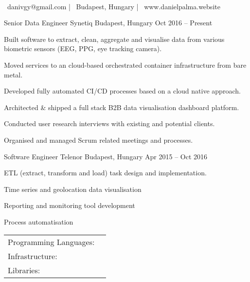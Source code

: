 \documentclass[]{awesome-cv}
\begin{document}
    
\begin{center}
	  \\
	\vspace{2mm}
	{\faEnvelope\ danivgy@gmail.com} | {\faMapMarker\ Budapest, Hungary} | {\faLink\ www.danielpalma.website}
\end{center}
\begin{cventries}
	\cventry
	{Senior Data Engineer}
	{Synetiq}
	{Budapest, Hungary}
	{Oct 2016 – Present}
	{\begin{cvitems}
		\item {Built software to extract, clean, aggregate and visualise data from various biometric sensors (EEG, PPG, eye tracking camera).}
		\item {Moved services to an cloud-based orchestrated container infrastructure from bare metal.}
		\item {Developed fully automated CI/CD processes based on a cloud native approach.}
		\item {Architected \& shipped a full stack B2B data visualisation dashboard platform.}
		\item {Conducted user research interviews with existing and potential clients.}
		\item {Organised and managed Scrum related meetings and processes.}
		\end{cvitems}}
	\cventry
	{Software Engineer}
	{Telenor}
	{Budapest, Hungary}
	{Apr 2015 – Oct 2016}
	{\begin{cvitems}
		\item {ETL (extract, transform and load) task design and implementation.}
		\item {Time series and geolocation data visualisation}
		\item {Reporting and monitoring tool development}
		\item {Process automatisation}
		\end{cvitems}}
\end{cventries}
\begin{cventries}
	\cventry
	{}
	{\def\arraystretch{1.15}{\begin{tabular}{ l l }
		Programming Languages:  & {\skill{ Python, SQL, JavaScript, Go, bash}} \\
		Infrastructure:  & {\skill{ Docker, Kubernetes, Linux,  PostgreSQL, Google Cloud Platform}} \\
		Libraries:  & {\skill{ pandas, Luigi, SQLAlchemy, Flask, Vue.js}} \\
		\end{tabular}}}
	{}
	{}
	{}
\end{cventries}
\end{document}

